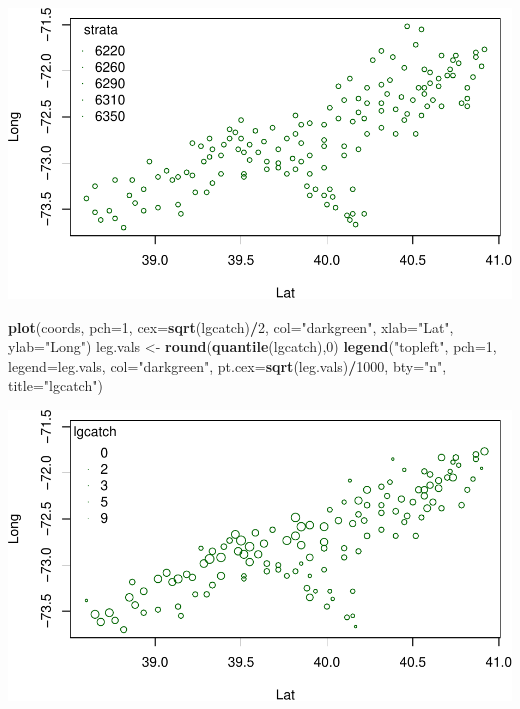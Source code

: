 \documentclass[]{article}
\newenvironment{Shaded}{\begin{snugshade}}{\end{snugshade}}
\newcommand{\KeywordTok}[1]{\textcolor[rgb]{0.13,0.29,0.53}{\textbf{#1}}}
\newcommand{\DataTypeTok}[1]{\textcolor[rgb]{0.13,0.29,0.53}{#1}}
\newcommand{\DecValTok}[1]{\textcolor[rgb]{0.00,0.00,0.81}{#1}}
\newcommand{\StringTok}[1]{\textcolor[rgb]{0.31,0.60,0.02}{#1}}
\newcommand{\OperatorTok}[1]{\textcolor[rgb]{0.81,0.36,0.00}{\textbf{#1}}}
\newcommand{\NormalTok}[1]{#1}
\begin{document}
\includegraphics{homework2_files/figure-latex/ex6_basic-1.pdf}

\begin{Shaded}
\begin{Highlighting}[]
\KeywordTok{plot}\NormalTok{(coords, }\DataTypeTok{pch=}\DecValTok{1}\NormalTok{, }\DataTypeTok{cex=}\KeywordTok{sqrt}\NormalTok{(lgcatch)}\OperatorTok{/}\DecValTok{2}\NormalTok{, }\DataTypeTok{col=}\StringTok{"darkgreen"}\NormalTok{, }\DataTypeTok{xlab=}\StringTok{"Lat"}\NormalTok{, }\DataTypeTok{ylab=}\StringTok{"Long"}\NormalTok{)}
\NormalTok{leg.vals <-}\StringTok{ }\KeywordTok{round}\NormalTok{(}\KeywordTok{quantile}\NormalTok{(lgcatch),}\DecValTok{0}\NormalTok{)}
\KeywordTok{legend}\NormalTok{(}\StringTok{"topleft"}\NormalTok{, }\DataTypeTok{pch=}\DecValTok{1}\NormalTok{, }\DataTypeTok{legend=}\NormalTok{leg.vals, }\DataTypeTok{col=}\StringTok{"darkgreen"}\NormalTok{,}
       \DataTypeTok{pt.cex=}\KeywordTok{sqrt}\NormalTok{(leg.vals)}\OperatorTok{/}\DecValTok{1000}\NormalTok{, }\DataTypeTok{bty=}\StringTok{"n"}\NormalTok{, }\DataTypeTok{title=}\StringTok{"lgcatch"}\NormalTok{)}
\end{Highlighting}
\end{Shaded}

\includegraphics{homework2_files/figure-latex/ex6_basic-2.pdf}
\end{document}
